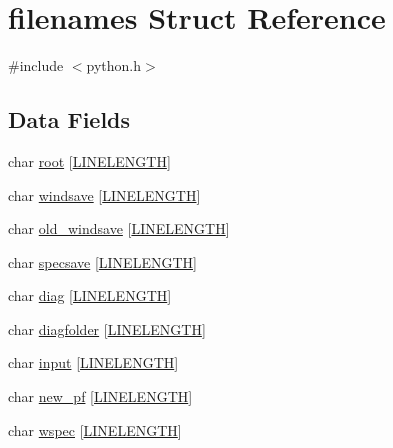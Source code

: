 \hypertarget{structfilenames}{}\section{filenames Struct Reference}
\label{structfilenames}


{\ttfamily \#include $<$python.\+h$>$}

\subsection*{Data Fields}
\begin{DoxyCompactItemize}
\item 
char \hyperlink{structfilenames_a8c053bab321640d4f0f5b75110980c89}{root} \mbox{[}\hyperlink{xlog_8c_a10e8c7b8458375c3dbfbb4010a2aba8c}{L\+I\+N\+E\+L\+E\+N\+G\+TH}\mbox{]}
\item 
char \hyperlink{structfilenames_a316c909bfa7dc0d7740d84f9d33d6418}{windsave} \mbox{[}\hyperlink{xlog_8c_a10e8c7b8458375c3dbfbb4010a2aba8c}{L\+I\+N\+E\+L\+E\+N\+G\+TH}\mbox{]}
\item 
char \hyperlink{structfilenames_ad7f42e4035f3ba3be6bbf16d00b7ba35}{old\+\_\+windsave} \mbox{[}\hyperlink{xlog_8c_a10e8c7b8458375c3dbfbb4010a2aba8c}{L\+I\+N\+E\+L\+E\+N\+G\+TH}\mbox{]}
\item 
char \hyperlink{structfilenames_a12010879e17a410582c95418e70fb8f4}{specsave} \mbox{[}\hyperlink{xlog_8c_a10e8c7b8458375c3dbfbb4010a2aba8c}{L\+I\+N\+E\+L\+E\+N\+G\+TH}\mbox{]}
\item 
char \hyperlink{structfilenames_a21f31ce0b0f82a7f5cf0d456088515fe}{diag} \mbox{[}\hyperlink{xlog_8c_a10e8c7b8458375c3dbfbb4010a2aba8c}{L\+I\+N\+E\+L\+E\+N\+G\+TH}\mbox{]}
\item 
char \hyperlink{structfilenames_a7bb82526145f9ba7f331da3cb3874280}{diagfolder} \mbox{[}\hyperlink{xlog_8c_a10e8c7b8458375c3dbfbb4010a2aba8c}{L\+I\+N\+E\+L\+E\+N\+G\+TH}\mbox{]}
\item 
char \hyperlink{structfilenames_ad69a4b6cb667c701b42275495c4cd002}{input} \mbox{[}\hyperlink{xlog_8c_a10e8c7b8458375c3dbfbb4010a2aba8c}{L\+I\+N\+E\+L\+E\+N\+G\+TH}\mbox{]}
\item 
char \hyperlink{structfilenames_a78ff170f6723c4497848c471d5faf579}{new\+\_\+pf} \mbox{[}\hyperlink{xlog_8c_a10e8c7b8458375c3dbfbb4010a2aba8c}{L\+I\+N\+E\+L\+E\+N\+G\+TH}\mbox{]}
\item 
char \hyperlink{structfilenames_aa5f57d0dd0cd0bb983889cff1a2de34c}{wspec} \mbox{[}\hyperlink{xlog_8c_a10e8c7b8458375c3dbfbb4010a2aba8c}{L\+I\+N\+E\+L\+E\+N\+G\+TH}\mbox{]}

\end{DoxyCompactItemize}
